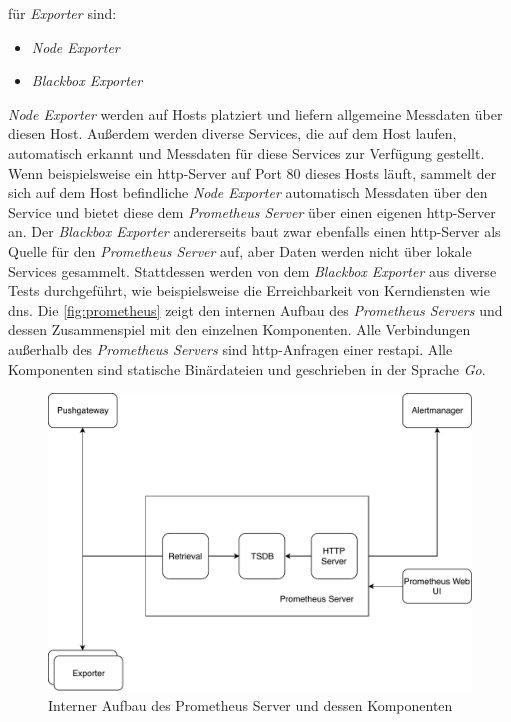 \documentclass[titlepage]{report}
\begin{document}
für \emph{Exporter} sind:
\begin{itemize}
    \item \emph{Node Exporter}
    \item \emph{Blackbox Exporter}
\end{itemize}
\emph{Node Exporter} werden auf Hosts platziert und liefern allgemeine
Messdaten über diesen Host. Außerdem werden diverse Services, die auf dem
Host laufen, automatisch erkannt und Messdaten für diese Services zur
Verfügung gestellt. Wenn beispielsweise ein \gls{http}\hyp{}Server auf
Port 80 dieses Hosts läuft, sammelt der sich auf dem Host befindliche \emph{Node
Exporter} automatisch Messdaten über den Service und bietet diese dem
\emph{Prometheus Server} über einen eigenen \gls{http}\hyp{}Server an.
Der \emph{Blackbox Exporter} andererseits baut zwar ebenfalls einen
\gls{http}\hyp{}Server als Quelle für den \emph{Prometheus Server} auf,
aber Daten werden nicht über lokale Services gesammelt. Stattdessen
werden von dem \emph{Blackbox Exporter} aus diverse Tests durchgeführt,
wie beispielsweise die Erreichbarkeit von Kerndiensten wie \gls{dns}.
Die \autoref{fig:prometheus} zeigt den internen Aufbau des
\emph{Prometheus Servers} und dessen Zusammenspiel mit den einzelnen
Komponenten. Alle Verbindungen außerhalb des \emph{Prometheus Servers}
sind \gls{http}\hyp{}Anfragen einer \gls{restapi}. Alle Komponenten sind
statische Binärdateien und geschrieben in der Sprache \emph{Go}.
\begin{figure}[H]
    \centering
    \includegraphics[width=1.0\textwidth]{figures/prometheus.pdf}
    \caption{Interner Aufbau des Prometheus Server und dessen
    Komponenten}\label{fig:prometheus}
\end{figure}
\end{document}
